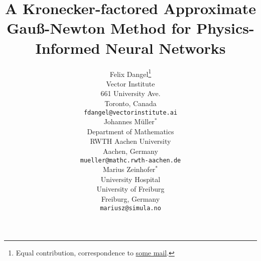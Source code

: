 \newcommand{\papertitle}{%
  A Kronecker-factored Approximate Gauß-Newton Method for Physics-Informed Neural Networks 
}
\title{\papertitle}

%

\author{%
  Felix Dangel\thanks{Equal contribution, correspondence to \url{some mail}.}\\
  Vector Institute\\
  661 University Ave. \\
  Toronto, Canada \\
  \texttt{fdangel@vectorinstitute.ai} \\
  \And
  Johannes M\"uller$^*$\\
  Department of Mathematics \\
  RWTH Aachen University \\
  Aachen, Germany \\
  \texttt{mueller@mathc.rwth-aachen.de} \\
  \And
  Marius Zeinhofer$^*$\\
  University Hospital \\
  University of Freiburg \\
  Freiburg, Germany \\
  \texttt{mariusz@simula.no} 
}
